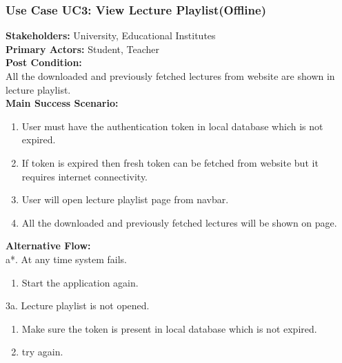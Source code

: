\documentclass[12pt]{article}
\begin{document}
\subsubsection{Use Case UC3: View Lecture Playlist(Offline)}
\textbf{Stakeholders: } University, Educational Institutes \\
\textbf{Primary Actors: } Student, Teacher \\
\textbf{Post Condition: }\\
All the downloaded and previously fetched lectures from website are shown in lecture playlist.\\
\textbf{Main Success Scenario: }
\begin{enumerate}
\item User must have the authentication token in local database which is not expired.
\item If token is expired then fresh token can be fetched from website but it requires internet connectivity.
\item User will open lecture playlist page from navbar.
\item All the downloaded and previously fetched lectures will be shown on page. 
\end{enumerate}
\textbf{Alternative Flow: }\\
a*. At any time system fails.
\begin{enumerate}
\item Start the application again.
\end{enumerate}
3a. Lecture playlist is not opened.
\begin{enumerate}
\item Make sure the token is present in local database which is not expired.
\item try again.
\end{enumerate}
\end{document}
